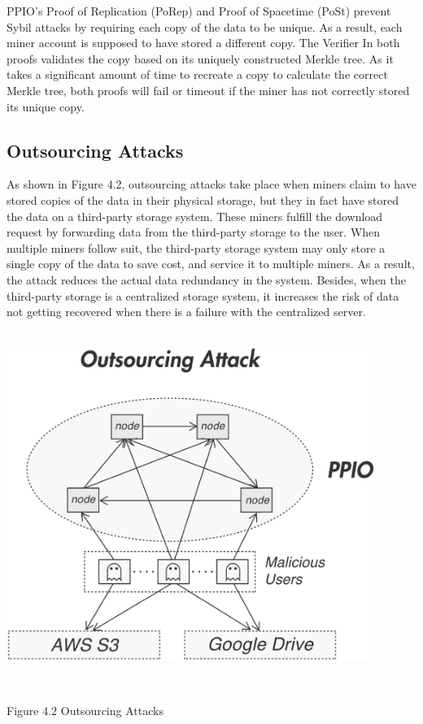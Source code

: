 \documentclass[10pt,a4paper]{article}
\begin{document}
\noindent   
PPIO’s Proof of Replication (PoRep) and Proof of Spacetime (PoSt) prevent Sybil attacks by requiring each copy of the data to be unique.  As a result, each miner account is supposed to have stored a different copy. The Verifier In both proofs validates the copy based on its uniquely constructed Merkle tree. As it takes a significant amount of time to recreate a copy to calculate the correct Merkle tree, both proofs will fail or timeout if the miner has not correctly stored its unique copy. 

      \subsection{Outsourcing Attacks}  %
As shown in Figure 4.2, outsourcing attacks take place when miners claim to have stored copies of the data in their physical storage, but they in fact have stored the data on a third-party storage system. These miners fulfill the download request by forwarding data from the third-party storage to the user. When multiple miners follow suit, the third-party storage system may only store a single copy of the data to save cost, and service it to multiple miners. As a result, the attack reduces the actual data redundancy in the system. Besides, when the third-party storage is a centralized storage system, it increases the risk of data not getting recovered when there is a failure with the centralized server.
   \vspace{-0.5em}
\\
\\ \centerline{\includegraphics[width=340pt]{fig16}}
\\ \centerline{{ Figure 4.2 Outsourcing Attacks}}
   \vspace{-1.5em}
 \\
\end{document}
